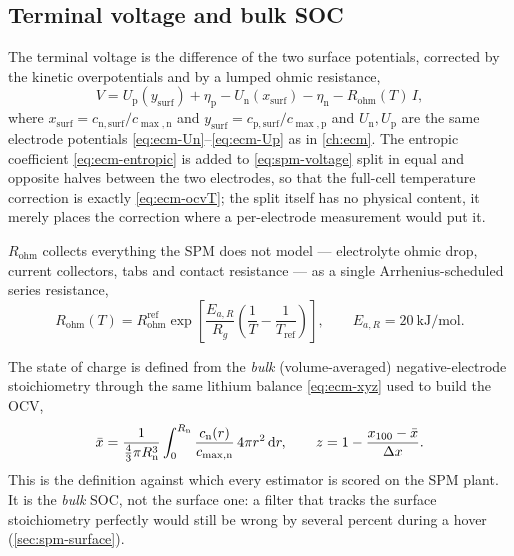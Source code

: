 \subsection{Terminal voltage and bulk SOC}
The terminal voltage is the difference of the two surface potentials, corrected by the kinetic
overpotentials and by a lumped ohmic resistance,
\begin{equation}
V = U_{\mathrm{p}}(y_{\mathrm{surf}}) + \eta_{\mathrm{p}}
  - U_{\mathrm{n}}(x_{\mathrm{surf}}) - \eta_{\mathrm{n}} - R_{\mathrm{ohm}}(T)\,I,
\label{eq:spm-voltage}
\end{equation}
where $x_{\mathrm{surf}} = c_{\mathrm{n,surf}}/c_{\max,\mathrm{n}}$ and
$y_{\mathrm{surf}} = c_{\mathrm{p,surf}}/c_{\max,\mathrm{p}}$ and $U_{\mathrm{n}},U_{\mathrm{p}}$
are the same electrode potentials \eqref{eq:ecm-Un}--\eqref{eq:ecm-Up} as in \cref{ch:ecm}. The
entropic coefficient \eqref{eq:ecm-entropic} is added to \eqref{eq:spm-voltage} split in equal
and opposite halves between the two electrodes, so that the full-cell temperature correction is
exactly \eqref{eq:ecm-ocvT}; the split itself has no physical content, it merely places the
correction where a per-electrode measurement would put it.

$R_{\mathrm{ohm}}$ collects everything the SPM does not model --- electrolyte ohmic drop, current
collectors, tabs and contact resistance --- as a single Arrhenius-scheduled series resistance,
\begin{equation}
R_{\mathrm{ohm}}(T) = R_{\mathrm{ohm}}^{\mathrm{ref}}
 \exp\!\left[\frac{E_{a,R}}{R_g}\left(\frac1T - \frac{1}{T_{\mathrm{ref}}}\right)\right],
\qquad E_{a,R} = \SI{20}{\kilo\joule\per\mole}.
\label{eq:spm-rohm}
\end{equation}

The state of charge is defined from the \emph{bulk} (volume-averaged) negative-electrode
stoichiometry through the same lithium balance \eqref{eq:ecm-xyz} used to build the OCV,
\begin{equation}
\bar{x} = \frac{1}{\tfrac43\pi R_{\mathrm{n}}^3}\int_0^{R_{\mathrm{n}}}
 \frac{c_{\mathrm{n}}(r)}{c_{\max,\mathrm{n}}}\,4\pi r^2\,\mathrm{d}r,
\qquad
z = 1 - \frac{x_{100}-\bar{x}}{\Delta x} .
\label{eq:spm-soc}
\end{equation}
This is the definition against which every estimator is scored on the SPM plant. It is the
\emph{bulk} SOC, not the surface one: a filter that tracks the surface stoichiometry perfectly
would still be wrong by several percent during a hover (\cref{sec:spm-surface}).

